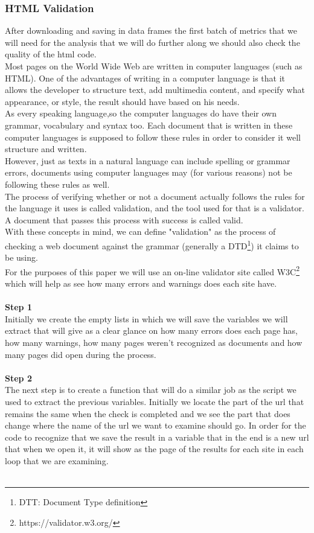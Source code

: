 \documentclass{article}
\begin{document}
\subsubsection{HTML Validation}
After downloading and saving in data frames the first batch of metrics that we will need for the analysis that we will do further along we should also check the quality of the html code.\\
Most pages on the World Wide Web are written in computer languages (such as HTML). One of the advantages of writing in a computer language is that it allows the developer to structure text, add multimedia content, and specify what appearance, or style, the result should have based on his needs.\\
As every speaking language,so the computer languages do have their own grammar, vocabulary and syntax too. Each document that is written in these computer languages is supposed to follow these rules in order to consider it well structure and written.\\
However, just as texts in a natural language can include spelling or grammar errors, documents using computer languages may (for various reasons) not be following these rules as well.\\
The process of verifying whether or not a document actually follows the rules for the language it uses is called validation, and the tool used for that is a validator. A document that passes this process with success is called valid.\\
With these concepts in mind, we can define "validation" as the process of checking a web document against the grammar (generally a DTD\footnote{DTT: Document Type definition}) it claims to be using.\\
For the purposes of this paper we will use an on-line validator site called W3C\footnote{https://validator.w3.org/} which will help as see how many errors and warnings does each site have. \\\\
\textbf{Step 1}\\
Initially we create the empty lists in which we will save the variables we will extract that will give as a clear glance on how many errors does each page has, how many warnings, how many pages weren't recognized as documents and how many pages did open during the process.\\\\
\textbf{Step 2}\\
The next step is to create a function that will do a similar job as the script we used to extract the previous variables. Initially we locate the part of the url that remains the same when the check is completed and we see the part that does change where the name of the url we want to examine should go. In order for the code to recognize that we save the result in a variable that in the end is a new url that when we open it, it will show as the page of the results for each site in each loop that we are examining.\\\\
\end{document}
